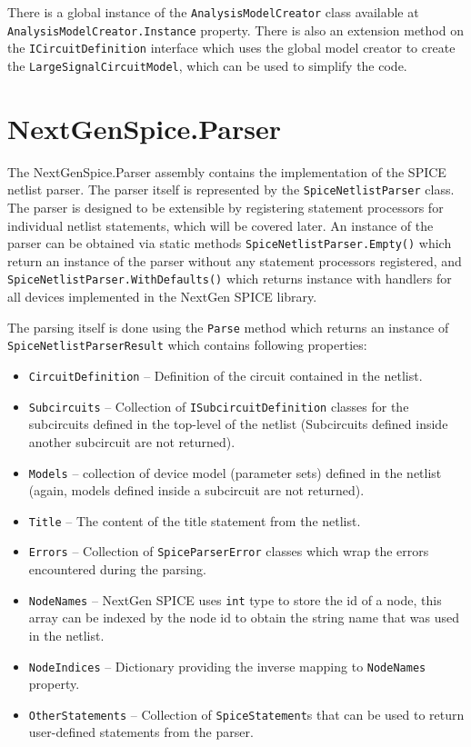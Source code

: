 There is a global instance of the \texttt{AnalysisModelCreator} class available at \texttt{AnalysisModelCreator.Instance} property. There is also an extension method on the \texttt{ICircuitDefinition} interface which uses the global model creator to create the \texttt{LargeSignalCircuitModel}, which can be used to simplify the code.

\section{NextGenSpice.Parser}
The NextGenSpice.Parser assembly contains the implementation of the SPICE netlist parser. The parser itself is represented by the \texttt{SpiceNetlistParser} class. The parser is designed to be extensible by registering statement processors for individual netlist statements, which will be covered later. An instance of the parser can be obtained via static methods \texttt{SpiceNetlistParser.Empty()} which return an instance of the parser without any statement processors registered, and \texttt{SpiceNetlistParser.WithDefaults()} which returns instance with handlers for all devices implemented in the NextGen SPICE library.

The parsing itself is done using the \texttt{Parse} method which returns an instance of \texttt{SpiceNetlistParserResult} which contains following properties:

\begin{itemize}
	\item \texttt{CircuitDefinition} -- Definition of the circuit contained in the netlist.
	\item \texttt{Subcircuits} -- Collection of \texttt{ISubcircuitDefinition} classes for the subcircuits defined in the top-level of the netlist (Subcircuits defined inside another subcircuit are not returned).
	\item \texttt{Models} -- collection of device model (parameter sets) defined in the netlist (again, models defined inside a subcircuit are not returned).
	\item \texttt{Title} -- The content of the title statement from the netlist.
	\item \texttt{Errors} -- Collection of \texttt{SpiceParserError} classes which wrap the errors encountered during the parsing.
	\item \texttt{NodeNames} -- NextGen SPICE uses \texttt{int} type to store the id of a node, this array can be indexed by the node id to obtain the string name that was used in the netlist. 
	\item \texttt{NodeIndices} -- Dictionary providing the inverse mapping to \texttt{NodeNames} property.
	\item \texttt{OtherStatements} -- Collection of \texttt{SpiceStatement}s that can be used to return user-defined statements from the parser.
\end{itemize}

